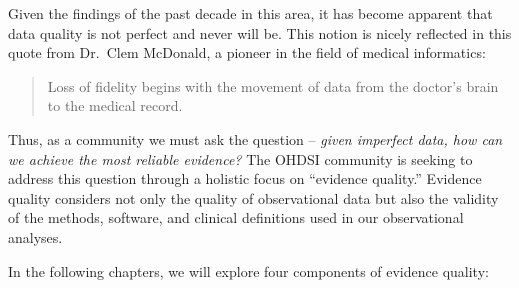 \documentclass[11pt]{book}
\theoremstyle{definition}
\theoremstyle{definition}
\theoremstyle{definition}
\theoremstyle{remark}
\begin{document}
Given the findings of the past decade in this area, it has become apparent that data quality is not perfect and never will be. This notion is nicely reflected in this quote from Dr.~Clem McDonald, a pioneer in the field of medical informatics:

\begin{quote}
Loss of fidelity begins with the movement of data from the doctor's brain to the medical record. 
\end{quote}

Thus, as a community we must ask the question -- \emph{given imperfect data, how can we achieve the most reliable evidence?} The OHDSI community is seeking to address this question through a holistic focus on ``evidence quality.'' Evidence quality considers not only the quality of observational data but also the validity of the methods, software, and clinical definitions used in our observational analyses.  

In the following chapters, we will explore four components of evidence quality:
\end{document}
